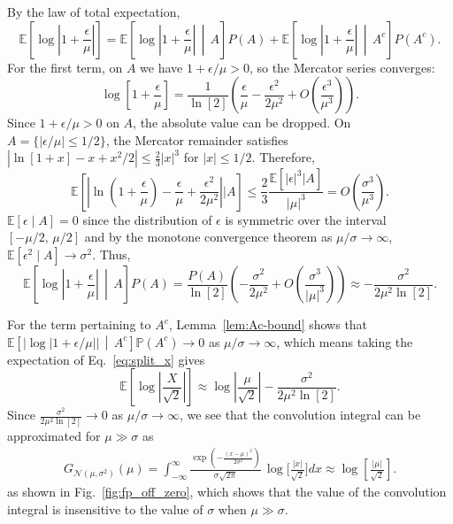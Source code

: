 \documentclass[12pt,onecolumn, margin=1in]{IEEEtran}
\newcommand{\bracket}[1]{\left[ #1 \right]}
\newcommand{\E}[1]{\mathbb{E}\left[ #1 \right]}
\begin{document}
By the law of total expectation,
\begin{equation}\label{eq:total_expect}
    \mathbb{E}\left[\log\left|1 + \frac{\epsilon}{\mu}\right|\right] = \mathbb{E}\left[\log\left|1 + \frac{\epsilon}{\mu}\right|\,\middle|\, A\right]P(A) + \mathbb{E}\left[\log\left|1 + \frac{\epsilon}{\mu}\right|\,\middle|\, A^c\right]P(A^c).
\end{equation}
For the first term, on $A$ we have $1+\epsilon/\mu > 0$, so the Mercator series converges:
\begin{equation}
    \log\left[1 + \frac{\epsilon}{\mu}\right] = \frac{1}{\ln[2]} \left( \frac{\epsilon}{\mu} - \frac{\epsilon^2}{2\mu^2} + O \left (\frac{\epsilon^3}{\mu^3}\right ) \right).
\end{equation}
Since $1+\epsilon/\mu > 0$ on $A$, the absolute value can be dropped. On $A = \{|\epsilon/\mu| \le 1/2\}$, the Mercator remainder satisfies $|\ln[1+x] - x + x^2/2| \le \frac{2}{3}|x|^3$ for $|x| \le 1/2$. Therefore,
\begin{equation}
    \E{\left|\ln\left(1+\frac{\epsilon}{\mu}\right) - \frac{\epsilon}{\mu} + \frac{\epsilon^2}{2\mu^2}\right| \Bigg|A} \le \frac{2}{3}\frac{\E{|\epsilon|^3|A}}{|\mu|^3} = O\left(\frac{\sigma^3}{\mu^3}\right).
\end{equation}
$\mathbb{E}[\epsilon \mid A] = 0$ since the distribution of $\epsilon$ is symmetric over the interval $\bracket{-\mu/2, \, \mu/2}$ and by the monotone convergence theorem as $\mu/\sigma \to \infty$,  $\mathbb{E}[\epsilon^2 \mid A] \to \sigma^2$. Thus,
\begin{equation}
    \mathbb{E}\left[\log\left|1 + \frac{\epsilon}{\mu}\right|\,\middle|\, A\right]P(A) = \frac{P(A)}{\ln[2]} \left( - \frac{\sigma^2}{2\mu^2} + O\left(\frac{\sigma^3}{|\mu|^3}\right) \right) \approx -\frac{\sigma^2}{2\mu^2 \ln[2]}.
\end{equation}

For the term pertaining to $A^c$, Lemma~\ref{lem:Ac-bound} shows that $\mathbb{E}\left[\left|\log\left|1 + \epsilon/\mu\right|\right|\,\middle|\, A^c\right]\mathbb{P}(A^c) \to 0$ as $\mu/\sigma \to \infty$, which means taking the expectation of Eq.~\eqref{eq:split_x} gives
\begin{equation}
    \mathbb{E} \left[\log\left|\frac{X}{\sqrt{2}}\right| \right] \approx \log\left|\frac{\mu}{\sqrt{2}}\right| - \frac{\sigma^2}{2\mu^2 \ln[2]}.
\end{equation}
Since $\frac{\sigma^2}{2\mu^2 \ln[2]} \rightarrow 0$ as $\mu/\sigma \rightarrow \infty$, we see that the convolution integral can be approximated for $\mu \gg \sigma$ as 
\begin{align}
    G_{\mathcal{N}(\mu,\sigma^2)}(\mu)=\int^{\infty}_{-\infty} \frac{\exp(-\frac{(x-\mu)^2}{2\sigma^2})}{\sigma \sqrt{2\pi}} \, \log \bigg[\frac{|x|}{\sqrt{2}} \bigg] dx \approx \log\left[\frac{|\mu|}{\sqrt{2}}\right].
\end{align}
as shown in Fig.~\ref{fig:fp_off_zero}, which shows that the value of the convolution integral is insensitive to the value of $\sigma$ when $\mu \gg \sigma$. 
\end{document}
